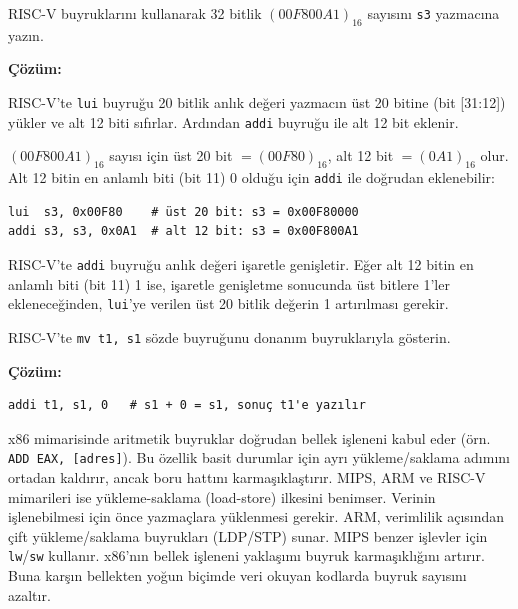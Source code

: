 \begin{ornek}[3.8]
RISC-V buyruklarını kullanarak 32 bitlik $(00F800A1)_{16}$ sayısını \texttt{s3} yazmacına yazın.

\textbf{Çözüm:}

RISC-V'te \texttt{lui} buyruğu 20 bitlik anlık değeri yazmacın üst 20 bitine (bit [31:12]) yükler ve alt 12 biti sıfırlar. Ardından \texttt{addi} buyruğu ile alt 12 bit eklenir.

$(00F800A1)_{16}$ sayısı için üst 20 bit $= (00F80)_{16}$, alt 12 bit $= (0A1)_{16}$ olur. Alt 12 bitin en anlamlı biti (bit 11) 0 olduğu için \texttt{addi} ile doğrudan eklenebilir:

\begin{lstlisting}[style=riscv]
lui  s3, 0x00F80    # üst 20 bit: s3 = 0x00F80000
addi s3, s3, 0x0A1  # alt 12 bit: s3 = 0x00F800A1
\end{lstlisting}

\begin{bilginot}
RISC-V'te \texttt{addi} buyruğu anlık değeri işaretle genişletir. Eğer alt 12 bitin en anlamlı biti (bit 11) 1 ise, işaretle genişletme sonucunda üst bitlere 1'ler ekleneceğinden, \texttt{lui}'ye verilen üst 20 bitlik değerin 1 artırılması gerekir.
\end{bilginot}
\end{ornek}

\begin{ornek}[3.9]
RISC-V'te \texttt{mv t1, s1} sözde buyruğunu donanım buyruklarıyla gösterin.

\textbf{Çözüm:}
\begin{lstlisting}[style=riscv]
addi t1, s1, 0   # s1 + 0 = s1, sonuç t1'e yazılır
\end{lstlisting}
\end{ornek}


\begin{karsilastirma}
x86 mimarisinde aritmetik buyruklar doğrudan bellek işleneni kabul eder (örn. \texttt{ADD EAX, [adres]}). Bu özellik basit durumlar için ayrı yükleme/saklama adımını ortadan kaldırır, ancak boru hattını karmaşıklaştırır. MIPS, ARM ve RISC-V mimarileri ise yükleme-saklama (load-store) ilkesini benimser. Verinin işlenebilmesi için önce yazmaçlara yüklenmesi gerekir. ARM, verimlilik açısından çift yükleme/saklama buyrukları (LDP/STP) sunar. MIPS benzer işlevler için \texttt{lw}/\texttt{sw} kullanır. x86'nın bellek işleneni yaklaşımı buyruk karmaşıklığını artırır. Buna karşın bellekten yoğun biçimde veri okuyan kodlarda buyruk sayısını azaltır.
\end{karsilastirma}


